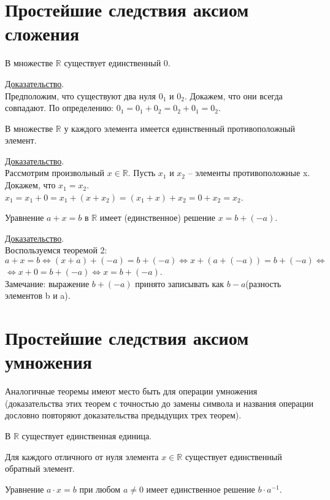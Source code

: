 \documentclass{article}
\begin{document}
    \section{Простейшие следствия аксиом сложения}
    \begin{theorem}
        В множестве \(\mathbb{R}\) существует единственный 0. 
    \end{theorem}
    \noindent
    \underline{Доказательство}.\\
    Предположим, что существуют два нуля \(0_{1}\) и \(0_{2}\). Докажем, что они всегда совпадают.
    По определению: \(0_{1} = 0_{1} + 0_{2} = 0_{2} + 0_{1} = 0_{2}\).
    \begin{theorem}
        В множестве \(\mathbb{R}\) у каждого элемента имеется единственный противоположный элемент. 
    \end{theorem}
    \noindent
    \underline{Доказательство}.\\
    Рассмотрим произвольный \(x \in \mathbb{R}\). Пусть \(x_{1}\) и \(x_{2}\) -- элементы противоположные x.
    Докажем, что \(x_{1} = x_{2}\). \(x_{1} = x_{1} + 0 = x_{1} + (x + x_{2}) = (x_{1} + x) + x_{2} = 0 + x_{2} = x_{2}\).
    \begin{theorem}
        Уравнение \(a + x = b\) в \(\mathbb{R}\) имеет (единственное) решение \(x = b + (-a)\).    
    \end{theorem}
    \noindent
    \underline{Доказательство}.\\
    Воспользуемся теоремой 2: \(a + x = b \Leftrightarrow (x + a) + (-a) = b + (-a) \Leftrightarrow x + (a + (-a)) = b + (-a)
    \Leftrightarrow\)\\ \(\Leftrightarrow x + 0 = b + (-a) \Leftrightarrow x = b + (-a)\).\\
    Замечание: выражение \(b + (-a)\) принято записывать как \(b - a\)(разность элементов b и a).\\
    \section{Простейшие следствия аксиом умножения}
    Аналогичные теоремы имеют место быть для операции умножения (доказательства этих теорем с точностью до замены символа и названия операции 
    дословно повторяют доказательства предыдущих трех теорем). 
    \begin{theorem}
        В \(\mathbb{R}\)  существует единственная единица.
    \end{theorem}
    \begin{theorem}
        Для каждого отличного от нуля элемента \(x \in \mathbb{R}\) существует единственный обратный элемент. 
    \end{theorem}
    \begin{theorem}
        Уравнение \(a \cdot x = b\) при любом \(a \neq 0\) имеет единственное решение \(b \cdot a^{-1}\).   
    \end{theorem}
\end{document}
